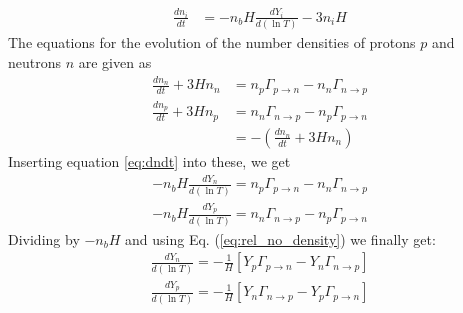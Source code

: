 \documentclass[reprint,english,notitlepage]{revtex4-1}  %
\numberwithin{equation}{section}
\begin{document}
\begin{align}
	\frac{d n_i}{dt} &= - n_b H \frac{dY_i}{d(\ln T)} - 3 n_i H \label{eq:dndt}
\end{align}
The equations for the evolution of the number densities of protons $p$ and
neutrons $n$ are given as
\begin{align}
	\frac{d n_n}{dt} + 3H n_n &= n_p \Gamma_{p\rightarrow n} - n_n\Gamma_{n\rightarrow p} \\
	\frac{d n_p}{dt} + 3H n_p &= n_n\Gamma_{n\rightarrow p} - n_p \Gamma_{p\rightarrow n}  \\
														&= - \left( \frac{d n_n}{dt} + 3H n_n \right)
\end{align}
Inserting equation \ref{eq:dndt} into these, we get
\begin{align}
	-n_b H \frac{dY_n}{d(\ln T)} = n_p \Gamma_{p\rightarrow n} - n_n \Gamma_{n\rightarrow p} \\
	-n_b H \frac{dY_p}{d(\ln T)} = n_n \Gamma_{n\rightarrow p} - n_p \Gamma_{p\rightarrow n}
\end{align}
Dividing by $-n_b H$ and using Eq. (\ref{eq:rel_no_density}) we finally get:
\begin{align}
	\frac{dY_n}{d(\ln T)} = -\frac{1}{H}\left[Y_p\Gamma_{p\rightarrow n} - Y_n \Gamma_{n\rightarrow p}\right] \\
	\frac{dY_p}{d(\ln T)} = -\frac{1}{H}\left[Y_n\Gamma_{n\rightarrow p} - Y_p \Gamma_{p\rightarrow n}\right]
\end{align}
\end{document}
